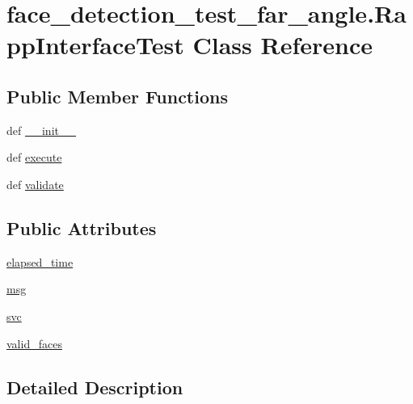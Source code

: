 \hypertarget{classface__detection__test__far__angle_1_1RappInterfaceTest}{\section{face\-\_\-detection\-\_\-test\-\_\-far\-\_\-angle.\-Rapp\-Interface\-Test Class Reference}
\label{classface__detection__test__far__angle_1_1RappInterfaceTest}
}
\subsection*{Public Member Functions}
\begin{DoxyCompactItemize}
\item 
def \hyperlink{classface__detection__test__far__angle_1_1RappInterfaceTest_a63294465220d31ba88bc8b61337a205d}{\-\_\-\-\_\-init\-\_\-\-\_\-}
\item 
def \hyperlink{classface__detection__test__far__angle_1_1RappInterfaceTest_afe737101bb11c220e78931969ffaee5a}{execute}
\item 
def \hyperlink{classface__detection__test__far__angle_1_1RappInterfaceTest_abc6864ec89e5ce08793e8dd63f204974}{validate}
\end{DoxyCompactItemize}
\subsection*{Public Attributes}
\begin{DoxyCompactItemize}
\item 
\hyperlink{classface__detection__test__far__angle_1_1RappInterfaceTest_a9210d01d594b0dea3608217d94a5605a}{elapsed\-\_\-time}
\item 
\hyperlink{classface__detection__test__far__angle_1_1RappInterfaceTest_a3884e78c483fc3ff16ca82b0ecdaafb8}{msg}
\item 
\hyperlink{classface__detection__test__far__angle_1_1RappInterfaceTest_ad94e3540bed07c1f2525b1f58f969e1b}{svc}
\item 
\hyperlink{classface__detection__test__far__angle_1_1RappInterfaceTest_a43da4f563cf8cc2c46264ef57e466ce3}{valid\-\_\-faces}
\end{DoxyCompactItemize}


\subsection{Detailed Description}



